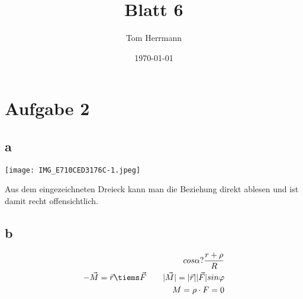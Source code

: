 \documentclass[11pt]{article}
\title{Blatt 6} %
\begin{document}
\lstset{language=Java}
\author{Tom Herrmann}
\date{\today}
\maketitle
\section{Aufgabe 2}
\subsection{a}
\begin{center}
	\texttt{[image: IMG\_E710CED3176C-1.jpeg]}
\end{center}
Aus dem eingezeichneten Dreieck kann man die Beziehung direkt ablesen und ist damit recht offensichtlich.
\subsection{b}
\begin{align*}
	cos \alpha ? \frac{r + \rho}{R}\\
	-\vec{M} = \vec{r} \tiems \vec{F} \qquad |\vec{M}| = |\vec{r}| |\vec{F}| sin \varphi\\
	M = \rho \cdot F = 0\\
	
\end{align*}
\end{document}
